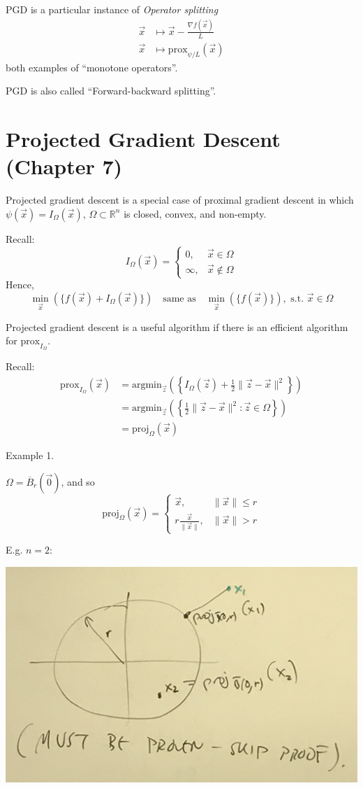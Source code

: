 \documentclass{article}
\newcommand{\R}{\mathbb{R}}             %
\newcommand{\x}{\vec{x}}                %
\newcommand{\z}{\vec{z}}                %
\newcommand{\rl}[1]{\left(#1\right)}
\begin{document}
PGD is a particular instance of \textit{Operator splitting}
\begin{align*}
    \x &\mapsto \vec{x} - \frac{\nabla f(\x)}{L} \\
    \x &\mapsto \text{prox}_{\psi/L}(\x)
\end{align*}
both examples of ``monotone operators''.

PGD is also called ``Forward-backward splitting''.

\section{Projected Gradient Descent (Chapter 7)}

Projected gradient descent is a special case of proximal gradient descent in which $\psi(\x) = I_\Omega(\x)$, $\Omega \subset \R^n$ is closed, convex, and non-empty.

Recall:
\[
    I_\Omega(\x) = \begin{cases}
        0, & \x \in \Omega \\
        \infty, & \x \notin \Omega
    \end{cases}
\]
Hence,
\[
\min_{\x}\rl{\{f(\x) + I_\Omega(\x)\}} \quad \text{same as} \quad \min_{\x}\rl{\{f(\x)\}}, \text{ s.t. } \x \in \Omega
\]

Projected gradient descent is a useful algorithm if there is an efficient algorithm for $\text{prox}_{I_\Omega}$.

Recall:
\begin{align*}
    \text{prox}_{I_\Omega}(\x) &= \text{argmin}_{\z} \rl{\left\{I_\Omega(\z) + \frac{1}{2}\|\z - \x\|^2\right\}} \\
    &= \text{argmin}_{\z}\rl{\left\{\frac{1}{2}\|\z - \x\|^2 : \z \in \Omega\right\}} \\
    &= \text{proj}_{\Omega}(\x)
\end{align*}

Example 1.

$\Omega = \overline{B}_r\rl{\vec{0}}$, and so
\[
    \text{proj}_{\Omega}(\x) = \begin{cases}
        \x, & \|\x\| \leq r \\
        r\frac{\x}{\|\x\|}, & \|\x\| > r
    \end{cases}
\]

E.g. $n = 2$:
\begin{center}
    \includegraphics[scale=0.1]{projection.JPG}
\end{center}
\end{document}
